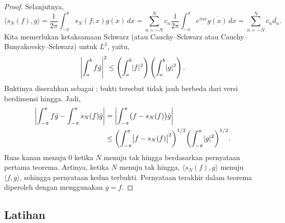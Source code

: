 \begin{proof}
Selanjutnya,
\begin{equation*}
\langle s_N(f) , g \rangle
=
\frac{1}{2\pi}
\int_{-\pi}^\pi
s_N(f;x) \overline{g(x)} \, dx
=
\sum_{n=-N}^N
c_n 
\frac{1}{2\pi}
\int_{-\pi}^\pi
e^{inx}
\overline{g(x)} \, dx
=
\sum_{n=-N}^N
c_n 
\overline{d_n} .
\end{equation*}
Kita memerlukan ketaksamaan Schwarz (atau Cauchy--Schwarz atau Cauchy--Bunyakovsky--Schwarz)
untuk $L^2$, yaitu,
\begin{equation*}
{\left\lvert {\int_a^b f\bar{g}} \right\rvert}^2
\leq
\left( \int_a^b \lvert {f} \rvert^2 \right)
\left( \int_a^b \lvert {g} \rvert^2 \right) .
\end{equation*}
Buktinya diserahkan sebagai ;
bukti tersebut tidak jauh
berbeda dari versi berdimensi hingga.
Jadi,
\begin{equation*}
\begin{split}
\left\lvert {\int_{-\pi}^\pi f\bar{g} - \int_{-\pi}^\pi s_N(f)\bar{g}} \right\rvert
& =
\left\lvert {\int_{-\pi}^\pi \bigl(f- s_N(f)\bigr)\bar{g}} \right\rvert \\
& \leq
{\left(\int_{-\pi}^\pi \bigl\lvert {f- s_N(f)} \bigr\rvert^2 \right)}^{1/2}
{\left( \int_{-\pi}^\pi \lvert {g} \rvert^2 \right)}^{1/2} .
\end{split}
\end{equation*}
Ruas kanan menuju 0 ketika $N$ menuju tak hingga berdasarkan pernyataan pertama
teorema.
Artinya, ketika $N$ menuju tak hingga, $\langle s_N(f),g \rangle$
menuju $\langle f,g \rangle$, sehingga
pernyataan kedua terbukti.  Pernyataan terakhir dalam teorema diperoleh dengan menggunakan
$g=f$.
\end{proof}

\subsection{Latihan}

